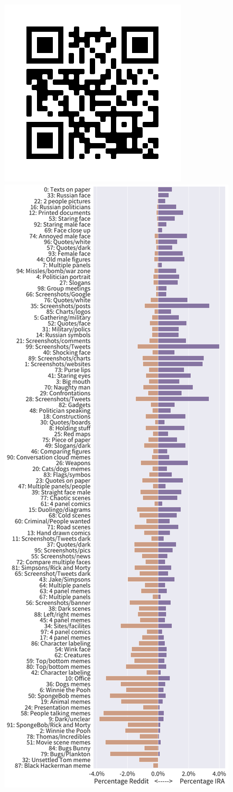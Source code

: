 \documentclass[article,36pt,extrafontsizes,oneside,openany,oldfontcommands]{memoir}
\begin{document}
\begin{adjmulticols*}{3}{0.5in}{0.5in}
  \begin{figure}
    \hspace{2cm}
    \includegraphics[width=.15\linewidth]{figure/qr_code.png}
    \hspace{5cm}
    \includegraphics[width=.63\linewidth]{figure/cluster_share.pdf}
  \end{figure}




\end{adjmulticols*}
\end{document}
